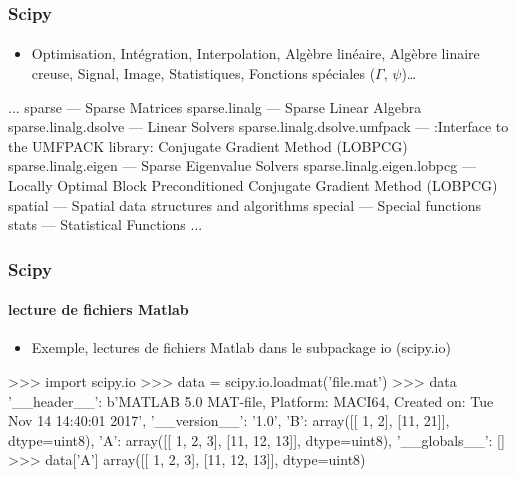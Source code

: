 \begin{frame}[fragile]
\frametitle{Scipy}
\framesubtitle{}
\begin{itemize}
 \item Optimisation, Intégration, Interpolation, Algèbre linéaire, Algèbre linaire creuse, Signal, Image, Statistiques, Fonctions spéciales ($\Gamma$, $\psi$)\dots
\end{itemize}
\begin{pythonConsole}
    ...
     sparse                       --- Sparse Matrices
     sparse.linalg                --- Sparse Linear Algebra
     sparse.linalg.dsolve         --- Linear Solvers
     sparse.linalg.dsolve.umfpack --- :Interface to the UMFPACK library:
                                      Conjugate Gradient Method (LOBPCG)
     sparse.linalg.eigen          --- Sparse Eigenvalue Solvers
     sparse.linalg.eigen.lobpcg   --- Locally Optimal Block Preconditioned
                                      Conjugate Gradient Method (LOBPCG)
     spatial                      --- Spatial data structures and algorithms
     special                      --- Special functions
     stats                        --- Statistical Functions
    ...
\end{pythonConsole}
\end{frame}
\begin{frame}[fragile]
\frametitle{Scipy}
\framesubtitle{lecture de fichiers Matlab}
\begin{itemize}
 \item Exemple, lectures de fichiers Matlab dans le subpackage io (scipy.io)
\end{itemize}

\begin{pythonConsole}
>>> import scipy.io
>>> data = scipy.io.loadmat('file.mat')
>>> data
{'__header__': b'MATLAB 5.0 MAT-file, Platform: MACI64, 
	Created on: Tue Nov 14 14:40:01 2017', '__version__': '1.0', 
    'B': array([[ 1,  2],
       [11, 21]], dtype=uint8), 'A': array([[ 1,  2,  3],
       [11, 12, 13]], dtype=uint8), '__globals__': []}
>>> data['A']
array([[ 1,  2,  3],
       [11, 12, 13]], dtype=uint8)

\end{pythonConsole}
\end{frame}
